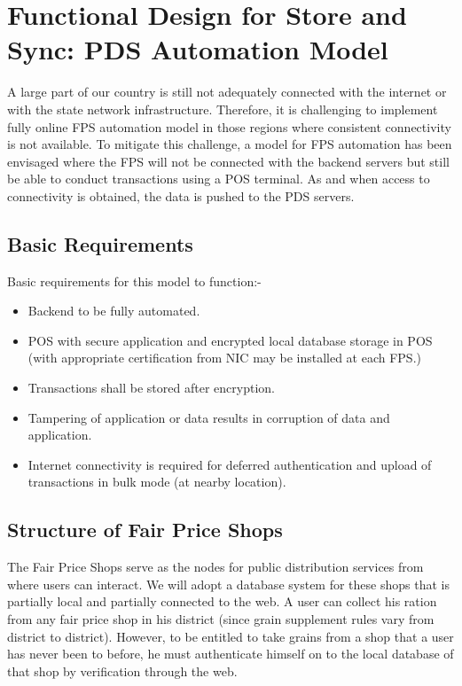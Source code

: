 \documentclass[a4paper,12pt]{extarticle}
\begin{document}
\section{Functional Design for Store and Sync: PDS Automation Model}

A large part of our country is still not adequately connected with the internet or with the state network infrastructure. Therefore, it is challenging to implement fully online FPS automation model in those regions where consistent connectivity is not available. To mitigate this challenge, a model for FPS automation has been envisaged where the FPS will not be connected with the backend servers but still be able to conduct transactions using a POS terminal. As and when access to connectivity is obtained, the data is pushed to the PDS servers.


\subsection{Basic Requirements}
Basic requirements for this model to function:-
\begin{itemize}
\item Backend to be fully automated.
\item POS with secure application and encrypted local database storage in POS (with appropriate certification from NIC may be installed at each FPS.)
\item Transactions shall be stored after encryption.
\item Tampering of application or data results in corruption of data and application.
\item Internet connectivity is required for deferred authentication and upload of transactions in bulk mode (at nearby location).
\end{itemize}


\subsection{Structure of Fair Price Shops}
The Fair Price Shops serve as the nodes for public distribution services from where users can interact. We will adopt a database system for these shops that is partially local and partially connected to the web.
A user can collect his ration from any fair price shop in his district (since grain supplement rules vary from district to district). 
However, to be entitled to take grains from a shop that a user has never been to before, he must authenticate himself on to the local database of that shop by verification through the web.
\end{document}
